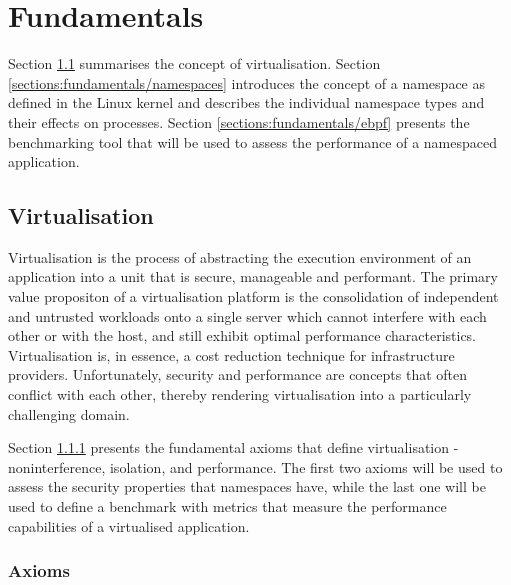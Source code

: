 \chapter{Fundamentals}
Section \ref{sections:fundamentals/virtualisation} summarises the concept of virtualisation.
Section \ref{sections:fundamentals/namespaces} introduces the concept of a namespace as defined 
in the Linux kernel and describes the individual namespace types and their effects on processes. 
Section \ref{sections:fundamentals/ebpf} presents the benchmarking tool 
that will be used to assess the performance of a namespaced application.

\section{Virtualisation}
\label{sections:fundamentals/virtualisation}
Virtualisation is the process of abstracting the execution environment of an application into 
a unit that is secure, manageable and performant. The primary value propositon of a virtualisation 
platform is the consolidation of independent and untrusted workloads onto a single 
server which cannot interfere with each other or with the host, and still exhibit optimal 
performance characteristics. Virtualisation is, in essence, a cost reduction technique for 
infrastructure providers. Unfortunately, security and performance are concepts that often conflict 
with each other, thereby rendering virtualisation into a particularly challenging domain.

Section \ref{sections:fundamentals/virtualisation/axioms} presents the fundamental axioms 
that define virtualisation - noninterference, isolation, and performance.
The first two axioms will be used to assess the security properties
that namespaces have, while the last one will be used to define a benchmark with metrics that 
measure the performance capabilities of a virtualised application. 

\subsection{Axioms}
\label{sections:fundamentals/virtualisation/axioms}
